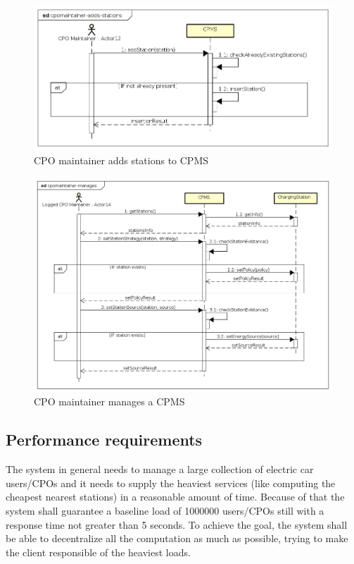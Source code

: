 \begin{figure}[!h]
    \begin{center}
        \includegraphics[keepaspectratio, width=16cm]{Sequence/cpomaintainer-adds-stations.png}
        \caption{\ac{CPO} maintainer adds stations to \ac{CPMS}}
    \end{center}
\end{figure}
\begin{figure}[!h]
    \begin{center}
        \includegraphics[keepaspectratio, width=16cm]{Sequence/cpomaintainer-manages.png}
        \caption{\ac{CPO} maintainer manages a \ac{CPMS}}
    \end{center}
\end{figure}

\clearpage
\subsection{Performance requirements}
The system in general needs to manage a large collection of electric car users/\acp{CPO} and it needs to supply the heaviest services (like computing the cheapest nearest stations) in a reasonable amount of time.
Because of that the system shall guarantee a baseline load of 1000000 users/\acp{CPO} still with a response time not greater than 5 seconds. To achieve the goal, the system shall be able to decentralize all the computation as much as possible,
trying to make the client responsible of the heaviest loads.

